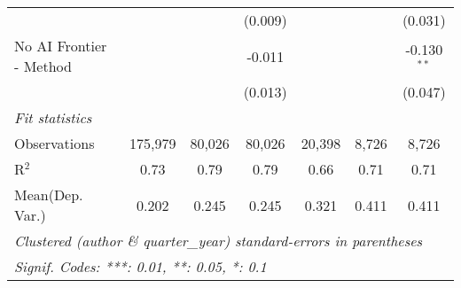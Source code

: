 \begin{tabular}{lcccccc}
                           &               &               & (0.009)       &               &                & (0.031)\\   
   No AI Frontier - Method &               &               & -0.011        &               &                & -0.130$^{**}$\\   
                           &               &               & (0.013)       &               &                & (0.047)\\   
   \midrule
   \emph{Fit statistics}\\
   Observations            & 175,979       & 80,026        & 80,026        & 20,398        & 8,726          & 8,726\\  
   R$^2$                   & 0.73          & 0.79          & 0.79          & 0.66          & 0.71           & 0.71\\  
Mean(Dep. Var.) & 0.202 & 0.245 & 0.245 & 0.321 & 0.411 & 0.411 \\
   \midrule \midrule
   \multicolumn{7}{l}{\emph{Clustered (author \& quarter\_year) standard-errors in parentheses}}\\
   \multicolumn{7}{l}{\emph{Signif. Codes: ***: 0.01, **: 0.05, *: 0.1}}\\
\end{tabular}
\par\endgroup
